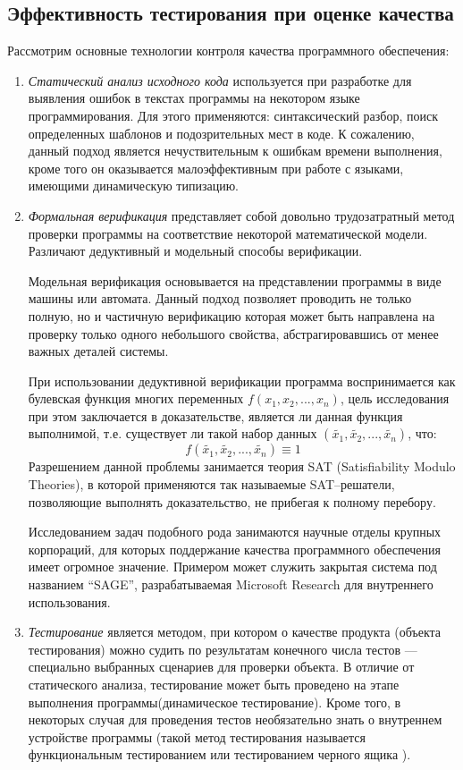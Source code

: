 \documentclass[a4paper,14pt,href]{article}
\begin{document}
\subsection{Эффективность тестирования при оценке качества}
  Рассмотрим основные технологии контроля качества программного обеспечения:
\begin{enumerate}
\item
	\textit{Статический анализ исходного кода} используется при разработке для выявления ошибок в текстах программы на некотором языке программирования. Для этого применяются: синтаксический разбор, поиск определенных шаблонов и подозрительных мест в коде. К сожалению, данный подход является нечуствительным к ошибкам времени выполнения, кроме того он оказывается малоэффективным при работе с языками, имеющими динамическую типизацию.
\item
	\textit{Формальная верификация}	 представляет собой довольно трудозатратный метод проверки программы на соответствие некоторой математической модели. Различают дедуктивный и модельный способы верификации.

	Модельная верификация основывается на представлении программы в виде машины или автомата. Данный подход позволяет проводить не только полную, но и частичную верификацию которая может быть направлена на проверку только одного небольшого свойства, абстрагировавшись от менее важных деталей системы\cite{OpenSystems}.

	При использовании дедуктивной верификации программа воспринимается как булевская функция многих переменных $f(x_1,x_2,...,x_n)$, цель исследования при этом заключается в доказательстве, является ли данная функция выполнимой, т.е. существует ли такой набор данных $(\tilde{x_1}, \tilde{x_2}, ..., \tilde{x_n})$, что:
	$$ f(\tilde{x_1}, \tilde{x_2}, ..., \tilde{x_n}) \equiv 1 $$
Разрешением данной проблемы занимается теория SAT (Satisfiability Modulo Theories), в которой применяются так называемые \linebreak SAT--решатели, позволяющие выполнять доказательство, не прибегая к полному перебору.

 Исследованием задач подобного рода занимаются научные отделы крупных корпораций, для которых поддержание качества программного обеспечения имеет огромное значение. Примером может служить закрытая система под названием ``SAGE'', разрабатываемая Microsoft Research для внутреннего использования\cite{SAGE}.

\item
	\textit{Тестирование} является методом, при котором о качестве продукта (объекта тестирования) можно судить по результатам конечного числа тестов --- специально выбранных сценариев для проверки объекта. В отличие от статического анализа, тестирование может быть проведено на этапе выполнения программы(динамическое тестирование). Кроме того, в некоторых случая для проведения тестов необязательно знать о внутреннем устройстве программы (такой метод тестирования называется функциональным тестированием или тестированием черного ящика\cite{TestingBlackBox} \cite{TestingComputerSoftware}).
\end{enumerate}
\end{document}

